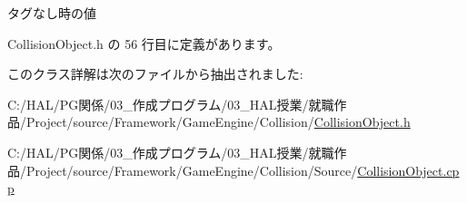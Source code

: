 タグなし時の値 



 Collision\+Object.\+h の 56 行目に定義があります。



このクラス詳解は次のファイルから抽出されました\+:\begin{DoxyCompactItemize}
\item 
C\+:/\+H\+A\+L/\+P\+G関係/03\+\_\+作成プログラム/03\+\_\+\+H\+A\+L授業/就職作品/\+Project/source/\+Framework/\+Game\+Engine/\+Collision/\mbox{\hyperlink{_collision_object_8h}{Collision\+Object.\+h}}\item 
C\+:/\+H\+A\+L/\+P\+G関係/03\+\_\+作成プログラム/03\+\_\+\+H\+A\+L授業/就職作品/\+Project/source/\+Framework/\+Game\+Engine/\+Collision/\+Source/\mbox{\hyperlink{_collision_object_8cpp}{Collision\+Object.\+cpp}}\end{DoxyCompactItemize}
